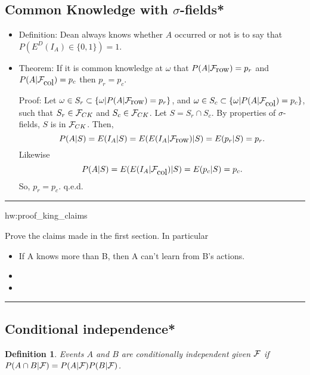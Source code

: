 \documentclass[14pt]{extarticle}
\newtheorem{definition}{Definition}
\newenvironment{textHW}{
  \noindent\rule{\textwidth}{1pt}%
  \begin{list}{}{
      \setlength{\labelwidth}{1cm}
      \setlength{\labelsep}{0.3cm}
      \setlength{\leftmargin}{1.3cm}
      \setlength{\rightmargin}{1cm}
      \setlength{\parsep}{0.5ex plus0.2ex minus0.1ex}
      \setlength{\topsep}{1pt plus3pt minus1pt}
      \setlength{\itemsep}{0ex plus0.2ex} 
      \renewcommand{\makelabel}[1]{\label{thw:##1}{\ref{##1}}}
      \sl}}%
  {\end{list}\rule{\textwidth}{1pt}}
\newcommand{\notes}{}
\begin{document}
        \subsection{Common Knowledge with $\sigma$-fields*}
\label{sec:math_CK}
  

  \begin{itemize}
  \item Definition: Dean always knows whether $A$ occurred or not is to
    say that $P\left(E^D(I_A) \in \{0,1\}\right) = 1$.
  \item Theorem: If it is common knowledge at $\omega$ that $P(A|{\cal
      F}_{\hbox{row}}) = p_r$ and $P(A|{\cal F}_{\hbox{col}}) = p_c$
    then $p_r = p_c$.

    Proof:  Let $\omega \in S_r \subset \{\omega|P(A|{\cal
      F}_{\hbox{row}}) = p_r\}$, and $\omega \in S_c \subset
    \{\omega|P(A|{\cal F}_{\hbox{col}}) = p_c\}$, such that $S_r \in
    {\cal F}_{CK}$ and $S_c \in {\cal F}_{CK}$.  Let $S = S_r \cap
    S_c$.  By properties of $\sigma$-fields, $S$ is in ${\cal
      F}_{CK}$.  Then, $$P(A|S) = E(I_{A}|S) = E(E(I_{A}|{\cal
      F}_{\hbox{row}})|S) = E(p_r|S) = p_r.$$ Likewise
    $$P(A|S) = E(E(I_{A}|{\cal F}_{\hbox{col}})|S) = E(p_c|S) = p_c.$$
    So, $p_r = p_c$.  \hfill q.e.d.
  \end{itemize}

\begin{textHW}
\item[hw:proof_king_claims] {\notes Prove the claims made in the first
    section.  In particular
    \begin{itemize}
    \item If A knows more than B, then A can't learn from B's actions.
    \item 
    \item 
    \end{itemize}}
\end{textHW}

        
 
        \subsection{Conditional independence*}
\label{sec:math_cond_indep}
%
\begin{definition} \label{def:independence} Events $A$ and $B$ are
  conditionally independent given ${\cal F}$ if $P(A \cap B|{\cal F})
  = P(A|{\cal F})P(B|{\cal F})$.
\end{definition}
\end{document}
